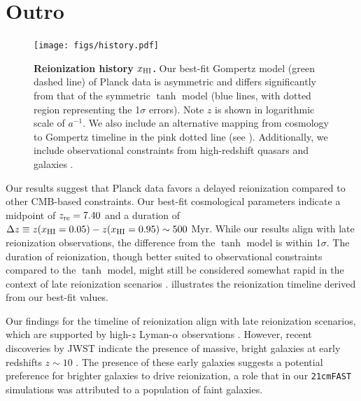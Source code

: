 \section*{Outro}

\begin{figure}[tb]
\centering
\texttt{[image: figs/history.pdf]}
\caption{\textbf{Reionization history $x_{\mathrm{HI}}$.}
Our best-fit Gompertz model (green dashed line) of Planck data is
asymmetric and differs significantly from that of the symmetric $\tanh$
model (blue lines, with dotted region representing the 1$\sigma$
errors).
Note $z$ is shown in logarithmic scale of $a^{-1}$.
We also include an alternative mapping from cosmology to Gompertz
timeline in the pink dotted line (see ).
Additionally, we include observational constraints from high-redshift
quasars \cite{Greig2017, Banados2018, Davies2018, Greig2019, Wang2020,
Yang2020, Greig2022, Jin2023} and galaxies \cite{Ouchi2010,
Sobacchi2015, Mason2018, Mason2019, Hoag2019, Mesinger2015}.
}
\label{fig:history}
\end{figure}

Our results suggest that Planck data favors a delayed reionization
compared to other CMB-based constraints.
Our best-fit cosmological parameters indicate a midpoint of $z_{\mathrm{re}} =
7.40$ and a duration of $\Delta z \equiv z(x_{\mathrm{HI}} = 0.05) - z(x_{\mathrm{HI}} =
0.95) \sim 500 $ Myr.
While our results align with late reionization observations, the
difference from the $\tanh$ model is within 1$\sigma$.
The duration of reionization, though better suited to observational
constraints compared to the $\tanh$ model, might still be considered
somewhat rapid in the context of late reionization scenarios
\cite{Cain2021}.
 illustrates the reionization timeline derived
from our best-fit values.

Our findings for the timeline of reionization align with late
reionization scenarios, which are supported by high-$z$ Lyman-$\alpha$
observations \cite{Keating2020, Cain2021}.
However, recent discoveries by JWST indicate the presence of massive,
bright galaxies at early redshifts $z \sim 10$
\cite{Adams2023, Bradley2023, Donnan2023}.
The presence of these early galaxies suggests a potential preference for
brighter galaxies to drive reionization, a role that in our
\texttt{21cmFAST} simulations was attributed to a population of faint
galaxies.

